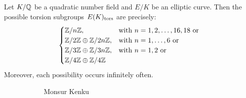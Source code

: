 \begin{frame}[plain]
\begin{thm}
 Let $K/\mathbb{Q}$ be a quadratic number field and $E/K$ be an elliptic curve. Then the possible torsion subgroups $E(K)_{\text{tors}}$ are precisely:
 	\[
	\begin{cases}
	\mathbb{Z}/n\mathbb{Z}, & \text{with } n=1,2,\ldots,16,18 \text{ or} \\
	\mathbb{Z}/2\mathbb{Z} \oplus \mathbb{Z}/2n\mathbb{Z}, & \text{with } n=1,\ldots,6 \text{ or} \\
	\mathbb{Z}/3\mathbb{Z} \oplus \mathbb{Z}/3n\mathbb{Z}, & \text{with } n=1,2 \text{ or} \\
	\mathbb{Z}/4\mathbb{Z} \oplus \mathbb{Z}/4\mathbb{Z}
	\end{cases}
	\]
Moreover, each possibility occurs infinitely often. 
\end{thm}
	\begin{figure}[h]
	\centering
	\begin{subfigure}{0.3\textwidth}
	\captionsetup{labelformat=empty}
	\centering
	\caption{Monsur Kenku}
	\end{subfigure} \;\;\;
	\begin{subfigure}{0.3\textwidth}
	\captionsetup{labelformat=empty}
	\centering

\end{subfigure}
\end{figure}
\end{frame}
